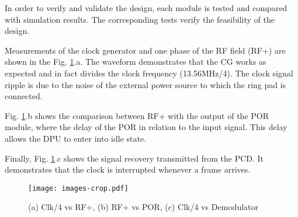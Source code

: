 In order to verify and validate the design, each module is tested and compared with simulation results. The corresponding tests verify the feasibility of the design.

Measurements of the clock generator and one phase of the RF field (RF+) are shown in the Fig. \ref{fig:meas}.a. The waveform demonstrates that the CG works as expected and in fact divides the clock frequency (13.56MHz/4). The clock signal ripple is due to the noise of the external power source to which the ring pad is connected. 

Fig. \ref{fig:meas}.b shows the comparison between RF+ with the output of the POR module, where the delay of the POR in relation to the input signal. This delay allows the DPU to enter into idle state.

Finally, Fig. \ref{fig:meas}.c shows the signal recovery transmitted from the PCD. It demonstrates that the clock is interrupted whenever a frame arrives.

\begin{figure}[h]
  \centering
  \texttt{[image: images-crop.pdf]}
  \caption{(a) Clk/4 vs RF+, (b) RF+ vs POR, (c) Clk/4 vs Demodulator}
  \label{fig:meas}
\end{figure}